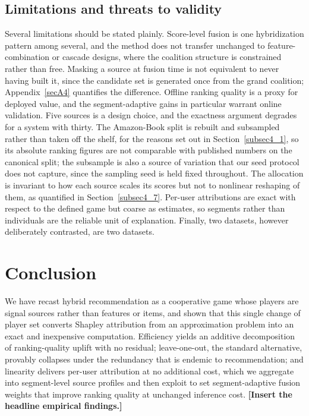 \documentclass[pdflatex,sn-mathphys-num]{sn-jnl}%
\theoremstyle{thmstyleone}%
\theoremstyle{thmstyletwo}%
\theoremstyle{thmstylethree}%
\newcommand{\tbd}[1]{\textbf{[#1]}}
\begin{document}
\subsection{Limitations and threats to validity}\label{subsec5_4}

Several limitations should be stated plainly. Score-level fusion is one hybridization pattern among several, and the method does not transfer unchanged to feature-combination or cascade designs, where the coalition structure is constrained rather than free. Masking a source at fusion time is not equivalent to never having built it, since the candidate set is generated once from the grand coalition; Appendix~\ref{secA4} quantifies the difference. Offline ranking quality is a proxy for deployed value, and the segment-adaptive gains in particular warrant online validation. Five sources is a design choice, and the exactness argument degrades for a system with thirty. The Amazon-Book split is rebuilt and subsampled rather than taken off the shelf, for the reasons set out in Section~\ref{subsec4_1}, so its absolute ranking figures are not comparable with published numbers on the canonical split; the subsample is also a source of variation that our seed protocol does not capture, since the sampling seed is held fixed throughout. The allocation is invariant to how each source scales its scores but not to nonlinear reshaping of them, as quantified in Section~\ref{subsec4_7}. Per-user attributions are exact with respect to the defined game but coarse as estimates, so segments rather than individuals are the reliable unit of explanation. Finally, two datasets, however deliberately contrasted, are two datasets.

\section{Conclusion}\label{sec6}

We have recast hybrid recommendation as a cooperative game whose players are signal sources rather than features or items, and shown that this single change of player set converts Shapley attribution from an approximation problem into an exact and inexpensive computation. Efficiency yields an additive decomposition of ranking-quality uplift with no residual; leave-one-out, the standard alternative, provably collapses under the redundancy that is endemic to recommendation; and linearity delivers per-user attribution at no additional cost, which we aggregate into segment-level source profiles and then exploit to set segment-adaptive fusion weights that improve ranking quality at unchanged inference cost. \tbd{Insert the headline empirical findings.}
\end{document}
